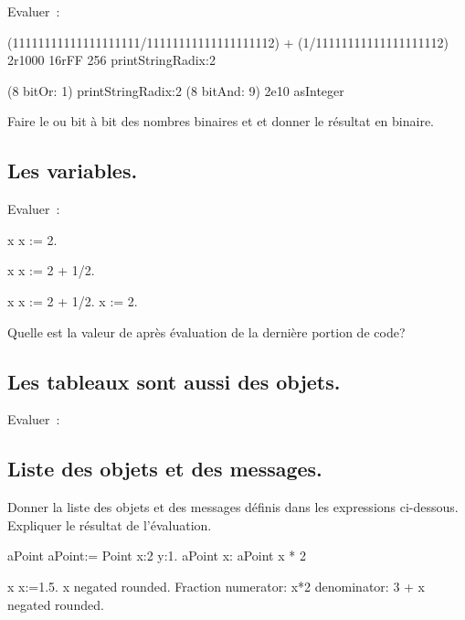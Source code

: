  Evaluer~:
\begin{scode}
(11111111111111111111/11111111111111111112) + (1/11111111111111111112)
2r1000
16rFF
256 printStringRadix:2

(8 bitOr: 1) printStringRadix:2
(8 bitAnd: 9)
2e10 asInteger
\end{scode}
Faire le ou bit \`a bit des nombres binaires  et  et donner le r\'esultat en binaire.


\subsection{Les variables.}

Evaluer~:
\begin{scode}
\stBar x \stBar
x := 2.

\stBar x \stBar
x := 2 + 1/2.

\stBar x \stBar
x := 2 + 1/2.
x := 2.
\end{scode}
Quelle est la valeur de  apr\`es \'evaluation de la derni\`ere portion de code?

\subsection{Les tableaux sont aussi des objets.}

 Evaluer~:



\subsection{Liste des objets et des messages.}
Donner la liste des objets et des messages d\'efinis dans les expressions ci-dessous. Expliquer le r\'esultat de l'\'evaluation.



\begin{scode}
\stBar aPoint \stBar
aPoint:= Point x:2 y:1.
aPoint x: aPoint x * 2

\stBar x \stBar
x:=1.5.
x negated rounded.
Fraction  numerator: x*2 denominator: 3 + x negated rounded.
\end{scode}



